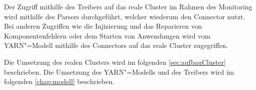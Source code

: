 Der Zugriff mithilfe des Treibers auf das reale Cluster im Rahmen des Monitoring wird mithilfe des Parsers durchgeführt, welcher wiederum den Connector nutzt.
Bei anderen Zugriffen wie \zB die Injizierung und das Reparieren von Komponentenfehlern oder dem Starten von Anwendungen wird vom YARN"=Modell mithilfe des Connectors auf das reale Cluster zugegriffen.

Die Umsetzung des realen Clusters wird im folgenden \autoref{sec:aufbauCluster} beschrieben.
Die Umsetzung des YARN"=Modells und des Treibers wird im folgenden \autoref{chap:modell} beschrieben.
